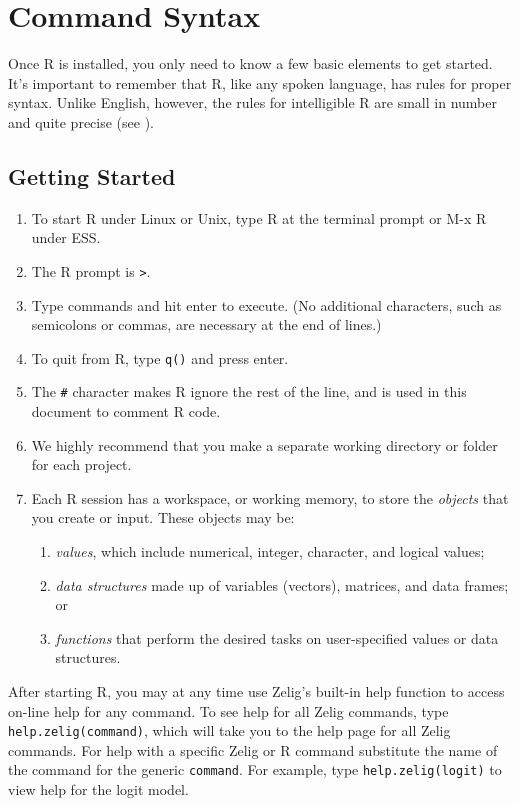 \documentclass{article}
\begin{document}
\label{c:R}

\section{Command Syntax}

Once R is installed, you only need to know a few basic elements to get
started.  It's important to remember that R, like any spoken
language, has rules for proper syntax.  Unlike English, however, the
rules for intelligible R are small in number and quite precise (see
).

\subsection{Getting Started}

\begin{enumerate}
\item To start R under Linux or Unix, type R at the terminal prompt or
  M-x R under ESS.
\item The R prompt is {\tt >}.
\item Type commands and hit enter to execute.  (No additional
  characters, such as semicolons or commas, are necessary at the end
  of lines.)
\item To quit from R, type \texttt{q()} and press enter.
\item The {\tt \#} character makes R ignore the rest of the line, and
  is used in this document to comment R code.
\item We highly recommend that you make a separate working directory
  or folder for each project.
\item Each R session has a workspace, or working memory, to store the
  \emph{objects} that you create or input.  These objects may be:
\begin{enumerate} 
\item \emph{values}, which include numerical, integer, character, and
  logical values;
\item \emph{data structures} made up of variables (vectors), matrices,
  and data frames; or
\item \emph{functions} that perform the desired tasks on
  user-specified values or data structures.
\end{enumerate}
\end{enumerate}

After starting R, you may at any time use Zelig's built-in help
function to access on-line help for any command.  To see help for all
Zelig commands, type {\tt help.zelig(command)}, which will take you
to the help page for all Zelig commands.  For help with a specific
Zelig or R command substitute the name of the command for the generic
{\tt command}.  For example, type {\tt help.zelig(logit)} to view
help for the logit model.
\end{document}
